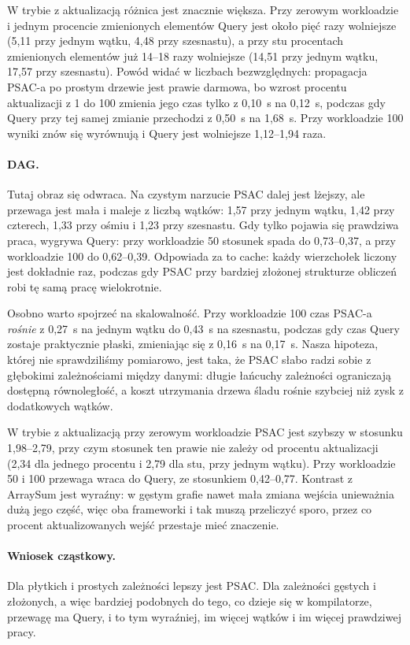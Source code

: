 \documentclass[11pt,a4paper]{article}
\begin{document}
W trybie z aktualizacją różnica jest znacznie większa. Przy zerowym workloadzie
i jednym procencie zmienionych elementów Query jest około pięć razy wolniejsze
(5,11 przy jednym wątku, 4,48 przy szesnastu), a przy stu procentach zmienionych
elementów już 14--18 razy wolniejsze (14,51 przy jednym wątku, 17,57 przy
szesnastu). Powód widać w liczbach bezwzględnych: propagacja PSAC-a po prostym
drzewie jest prawie darmowa, bo wzrost procentu aktualizacji z 1 do 100 zmienia
jego czas tylko z 0,10~s na 0,12~s, podczas gdy Query przy tej samej zmianie
przechodzi z 0,50~s na 1,68~s. Przy workloadzie 100 wyniki znów się wyrównują
i Query jest wolniejsze 1,12--1,94 raza.

\paragraph{DAG.} Tutaj obraz się odwraca. Na czystym narzucie PSAC dalej jest
lżejszy, ale przewaga jest mała i maleje z liczbą wątków: 1,57 przy jednym
wątku, 1,42 przy czterech, 1,33 przy ośmiu i 1,23 przy szesnastu. Gdy tylko
pojawia się prawdziwa praca, wygrywa Query: przy workloadzie 50 stosunek spada do
0,73--0,37, a przy workloadzie 100 do 0,62--0,39. Odpowiada za to cache: każdy
wierzchołek liczony jest dokładnie raz, podczas gdy PSAC przy bardziej złożonej
strukturze obliczeń robi tę samą pracę wielokrotnie.

Osobno warto spojrzeć na skalowalność. Przy workloadzie 100 czas PSAC-a
\emph{rośnie} z 0,27~s na jednym wątku do 0,43~s na szesnastu, podczas gdy czas
Query zostaje praktycznie płaski, zmieniając się z 0,16~s na 0,17~s. Nasza
hipoteza, której nie sprawdziliśmy pomiarowo, jest taka, że PSAC słabo radzi
sobie z głębokimi zależnościami między danymi: długie łańcuchy zależności
ograniczają dostępną równoległość, a koszt utrzymania drzewa śladu rośnie
szybciej niż zysk z dodatkowych wątków.

W trybie z aktualizacją przy zerowym workloadzie PSAC jest szybszy w stosunku
1,98--2,79, przy czym stosunek ten prawie nie zależy od procentu aktualizacji
(2,34 dla jednego procentu i 2,79 dla stu, przy jednym wątku). Przy workloadzie
50 i 100 przewaga wraca do Query, ze stosunkiem 0,42--0,77. Kontrast z ArraySum
jest wyraźny: w gęstym grafie nawet mała zmiana wejścia unieważnia dużą jego
część, więc oba frameworki i tak muszą przeliczyć sporo, przez co procent
aktualizowanych wejść przestaje mieć znaczenie.

\paragraph{Wniosek cząstkowy.} Dla płytkich i prostych zależności lepszy jest
PSAC. Dla zależności gęstych i złożonych, a więc bardziej podobnych do tego, co
dzieje się w kompilatorze, przewagę ma Query, i to tym wyraźniej, im więcej
wątków i im więcej prawdziwej pracy.
\end{document}
